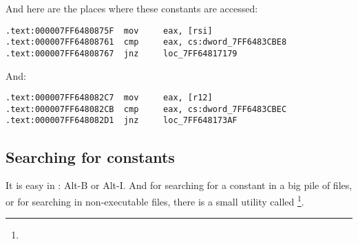 And here are the places where these constants are accessed:

\begin{lstlisting}[caption=dhcpcore.dll (Windows 7 x64)]
.text:000007FF6480875F  mov     eax, [rsi]
.text:000007FF64808761  cmp     eax, cs:dword_7FF6483CBE8
.text:000007FF64808767  jnz     loc_7FF64817179
\end{lstlisting}

And:

\begin{lstlisting}[caption=dhcpcore.dll (Windows 7 x64)]
.text:000007FF648082C7  mov     eax, [r12]
.text:000007FF648082CB  cmp     eax, cs:dword_7FF6483CBEC
.text:000007FF648082D1  jnz     loc_7FF648173AF
\end{lstlisting}

\subsection{Searching for constants}

It is easy in \IDA: Alt-B or Alt-I.
And for searching for a constant in a big pile of files, or for searching in non-executable files,
there is a small utility called \footnote{\BGREPURL}.

